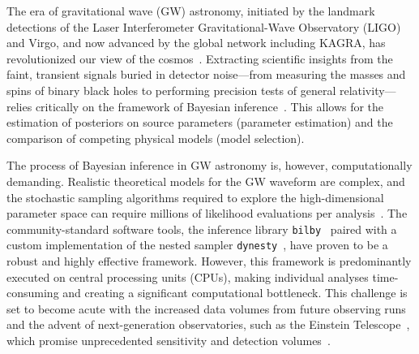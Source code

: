 \documentclass[fleqn,usenatbib]{mnras}
\begin{document}


The era of gravitational wave (GW) astronomy, initiated by the landmark
detections of the Laser Interferometer Gravitational-Wave Observatory (LIGO) and
Virgo, and now advanced by the global network including KAGRA, has revolutionized
our view of the cosmos~\citep{GW150914, GW170817,GWTC1,GWTC2, GWTC3,GWTC3_pop_analysis,GWTC2_GR,siren}. 
Extracting scientific insights from the faint, transient signals buried in detector noise—from measuring the
masses and spins of binary black holes to performing precision tests of general
relativity—relies critically on the framework of Bayesian inference~\citep{Thrane_2019}. 
This allows for the estimation of posteriors on source parameters
(parameter estimation) and the comparison of competing physical models (model selection).

The process of Bayesian inference in GW astronomy is, however, computationally
demanding. Realistic theoretical models for the GW waveform are complex, and the
stochastic sampling algorithms required to explore the high-dimensional parameter
space can require millions of likelihood evaluations per analysis~\citep{LIGO_guide_signalextraction}.
The community-standard software tools, the inference library \texttt{bilby}~\citep{bilby_paper}
paired with a custom implementation of the nested sampler \texttt{dynesty}~\citep{dynesty}, 
have proven to be a robust and highly effective framework.
However, this framework is predominantly executed on central processing units
(CPUs), making individual analyses time-consuming and creating a significant
computational bottleneck. This challenge is set to become acute with the
increased data volumes from future observing runs~\citep{aLIGO, aVirgo, aLVK_prospects} and the advent of
next-generation observatories, such as the Einstein Telescope~\citep{ET_science_case}, which promise
unprecedented sensitivity and detection volumes~\citep{HuAccelerationReview}.
\end{document}
